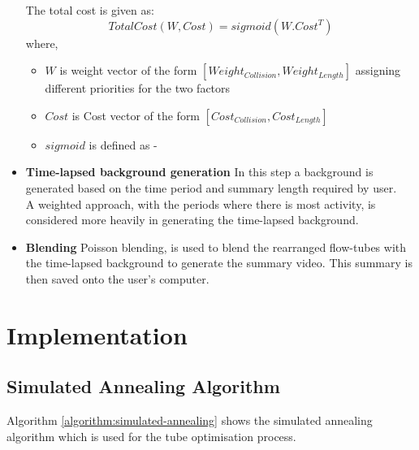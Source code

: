 \documentclass[conference]{IEEEtran}
\begin{document}
\begin{itemize}
    The total cost is given as:
    \begin{equation} \label{eqn:totalCost}
    TotalCost(W, Cost) = sigmoid(W.Cost^{T})
    \end{equation}
    where,
    \begin{itemize}
        \item \(W\) is weight vector of the form \([ Weight_{Collision}, Weight_{Length} ]\) assigning different priorities for the two factors
        \item \(Cost\) is Cost vector of the form \([ Cost_{Collision}, Cost_{Length} ]\)
        \item \(sigmoid\) is defined as - \\

    \end{itemize}


    \item \textbf{Time-lapsed background generation}
    In this step a background is generated based on the time period and summary
    length required by user. \\

    A weighted approach, with the periods where there is most activity, is
    considered more heavily in generating the time-lapsed background.

    \item \textbf{Blending}
    Poisson blending\cite{szeliski2011fast},\cite{Perez:2003:PIE:1201775.882269}
    is used to blend the rearranged flow-tubes with the time-lapsed background
    to generate the summary video. This summary is then saved onto the
    user’s computer.
\end{itemize}

\section{Implementation}

    \subsection{Simulated Annealing Algorithm}
    Algorithm \ref{algorithm:simulated-annealing} shows the simulated annealing algorithm
    which is used for the tube optimisation process.
\end{document}
